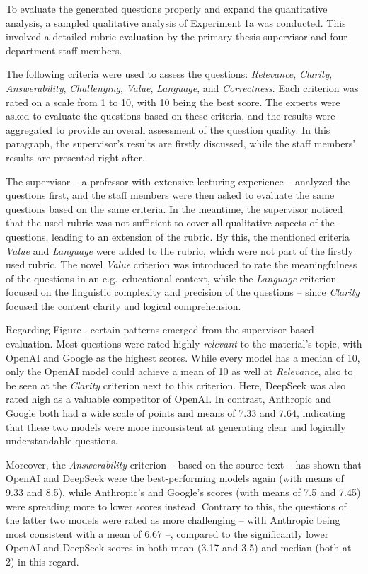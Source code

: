 To evaluate the generated questions properly and expand the quantitative analysis, a sampled qualitative analysis of Experiment 1a was conducted. This involved a detailed rubric evaluation by the primary thesis supervisor and four department staff members.

 The following criteria were used to assess the questions: \textit{Relevance}, \textit{Clarity}, \textit{Answerability}, \textit{Challenging}, \textit{Value}, \textit{Language}, and \textit{Correctness}. Each criterion was rated on a scale from 1 to 10, with 10 being the best score. The experts were asked to evaluate the questions based on these criteria, and the results were aggregated to provide an overall assessment of the question quality. In this paragraph, the supervisor's results are firstly discussed, while the staff members' results are presented right after. 

The supervisor -- a professor with extensive lecturing experience -- analyzed the questions first, and the staff members were then asked to evaluate the same questions based on the same criteria. In the meantime, the supervisor noticed that the used rubric was not sufficient to cover all qualitative aspects of the questions, leading to an extension of the rubric. By this, the mentioned criteria \textit{Value} and \textit{Language} were added to the rubric, which were not part of the firstly used rubric. The novel \textit{Value} criterion was introduced to rate the meaningfulness of the questions in an e.g.\ educational context, while the \textit{Language} criterion focused on the linguistic complexity and precision of the questions -- since \textit{Clarity} focused the content clarity and logical comprehension.

Regarding Figure , certain patterns emerged from the supervisor-based evaluation. Most questions were rated highly \textit{relevant} to the material's topic, with OpenAI and Google as the highest scores. While every model has a median of 10, only the OpenAI model could achieve a mean of 10 as well at \textit{Relevance}, also to be seen at the \textit{Clarity} criterion next to this criterion. Here, DeepSeek was also rated high as a valuable competitor of OpenAI. In contrast, Anthropic and Google both had a wide scale of points and means of 7.33 and 7.64, indicating that these two models were more inconsistent at generating clear and logically understandable questions. 

Moreover, the \textit{Answerability} criterion -- based on the source text -- has shown that OpenAI and DeepSeek were the best-performing models again (with means of 9.33 and 8.5), while Anthropic's and Google's scores (with means of 7.5 and 7.45) were spreading more to lower scores instead. Contrary to this, the questions of the latter two models were rated as more challenging -- with Anthropic being most consistent with a mean of 6.67 --, compared to the significantly lower OpenAI and DeepSeek scores in both mean (3.17 and 3.5) and median (both at 2) in this regard.

